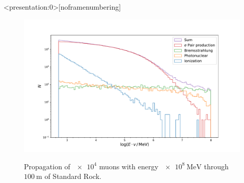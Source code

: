 \documentclass[aspectratio=1610, captions=tableheading, 11pt]{beamer}
\begin{document}
\begin{frame}<presentation:0>[noframenumbering]
\begin{figure}
  \begin{minipage}[c]{0.7\textwidth}
    \includegraphics[width=\textwidth , trim=1.9cm 0.5cm 1.9cm 2cm,clip=true]{plots/standard.pdf}
  \end{minipage}\hfill
  \begin{minipage}[c]{0.3\textwidth}
    Propagation of $\num{e4}$ muons with energy $\SI{e8}{\mega\electronvolt}$ through $\SI{100}{\metre}$ of Standard Rock.
     \label{fig:03-03}
  \end{minipage}
\end{figure}

\end{frame}

\end{document}
